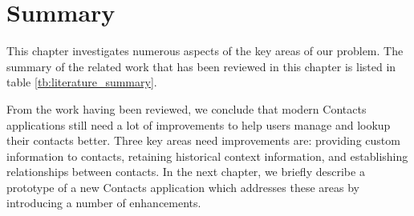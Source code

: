 

\section{Summary}\label{section:literature_summary}

This chapter investigates numerous aspects of the key areas of our problem. The summary of the related work that has been reviewed in this chapter is listed in table \ref{tb:literature_summary}.

From the work having been reviewed, we conclude that modern Contacts applications still need a lot of improvements to help users manage and lookup their contacts better. Three key areas need improvements are: providing custom information to contacts, retaining historical context information, and establishing relationships between contacts. In the next chapter, we briefly describe a prototype of a new Contacts application which addresses these areas by introducing a number of enhancements.

